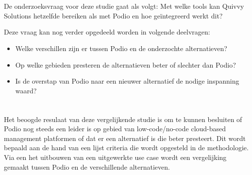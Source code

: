 \section{}%
\label{sec:onderzoeksvraag} %


De onderzoeksvraag voor deze studie gaat als volgt: Met welke tools kan Quivvy Solutions hetzelfde bereiken als met Podio en hoe geïntegreerd werkt dit?

Deze vraag kan nog verder opgedeeld worden in volgende deelvragen:
\begin{itemize}
    \item Welke verschillen zijn er tussen Podio en de onderzochte alternatieven?
    \item Op welke gebieden presteren de alternatieven beter of slechter dan Podio?
    \item Is de overstap van Podio naar een nieuwer alternatief de nodige inspanning waard?
\end{itemize}

\section{}%
\label{sec:onderzoeksdoelstelling} %

Het beoogde resulaat van deze vergelijkende studie is om te kunnen besluiten of Podio nog steeds een leider is op gebied van low-code/no-code cloud-based management platformen of dat er een alternatief is die beter presteert. Dit wordt bepaald aan de hand van een lijst criteria die wordt opgesteld in de methodologie. Via een het uitbouwen van een uitgewerkte use case wordt een vergelijking gemaakt tussen Podio en de verschillende alternatieven.

